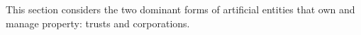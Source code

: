 This section considers the two dominant forms of artificial entities that own
and manage property: trusts and corporations.

